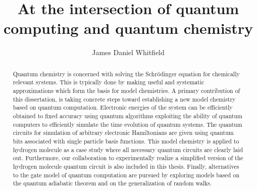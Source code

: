 


\ssp






\title{At the intersection of quantum computing and quantum chemistry}
\author{James Daniel Whitfield}

\maketitle
\copyrightpage


\begin{abstract}
Quantum chemistry is concerned with solving the Schr\"odinger equation for chemically relevant systems.  This is typically done 
by making useful and systematic approximations which form the basis for model chemistries.
A primary contribution of this dissertation, is taking concrete steps toward establishing a new model chemistry based on quantum computation.  Electronic energies of the system can be efficiently obtained to fixed accuracy using quantum algorithms exploiting the ability of quantum computers to efficiently simulate the time evolution of quantum systems.  
The quantum circuits for simulation of arbitrary electronic Hamiltonians are given using quantum bits associated with single particle basis functions.  This model chemistry is applied to hydrogen molecule as a case study where all necessary quantum circuits are clearly laid out.
Furthermore, our collaboration to experimentally realize a simplified version of the hydrogen molecule quantum circuit is also included in this thesis. 
Finally, alternatives to the gate model of quantum computation are pursued by exploring models based on the quantum adiabatic theorem and on the generalization of random walks.

\end{abstract}





